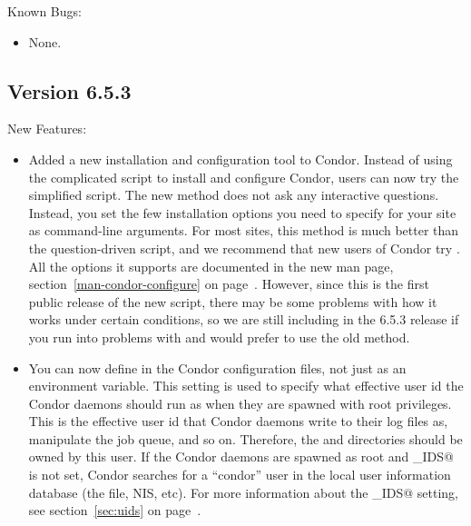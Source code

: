 \noindent Known Bugs:

\begin{itemize}

\item None.

\end{itemize}


\subsection{\label{sec:New-6-5-3}Version 6.5.3}

\noindent New Features:

\begin{itemize}

\item Added a new installation and configuration tool to Condor.
  Instead of using the complicated  script to install
  and configure Condor, users can now try the simplified
   script.
  The new method does not ask any interactive questions.
  Instead, you set the few installation options you need to specify
  for your site as command-line arguments.
  For most sites, this method is much better than the question-driven
   script, and we recommend that new users of Condor
  try .
  All the options it supports are documented in the new
   man page, section~\ref{man-condor-configure} on
  page~\pageref{man-condor-configure}. 
  However, since this is the first public release of the new script,
  there may be some problems with how it works under certain
  conditions, so we are still including  in the 6.5.3 
  release if you run into problems with  and would
  prefer to use the old method. 

\item You can now define  in the Condor
  configuration files, not just as an environment variable.
  This setting is used to specify what effective user id the Condor
  daemons should run as when they are spawned with root privileges.
  This is the effective user id that Condor daemons write to their log
  files as, manipulate the job queue, and so on.
  Therefore, the  and  directories should be
  owned by this user.
  If the Condor daemons are spawned as root and \verb@CONDOR_IDS@ is
  not set, Condor searches for a ``condor'' user in the local user
  information database (the  file, NIS, etc).
  For more information about the \verb@CONDOR_IDS@ setting, see
  section~\ref{sec:uids} on page~\pageref{sec:uids}.


\end{itemize}
